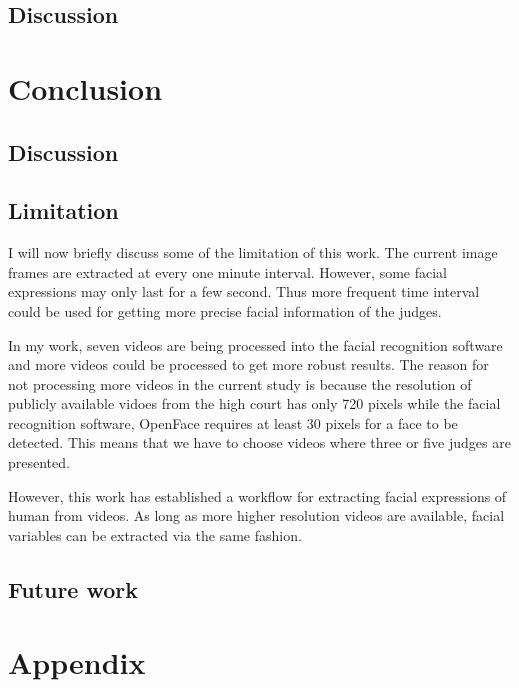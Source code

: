 \documentclass{monashthesis}
\begin{document}
\hypertarget{discussion}{%
\section{Discussion}\label{discussion}}

\hypertarget{conclusion}{%
\chapter{Conclusion}\label{conclusion}}

\hypertarget{discussion-1}{%
\section{Discussion}\label{discussion-1}}

\hypertarget{limitation}{%
\section{Limitation}\label{limitation}}

I will now briefly discuss some of the limitation of this work. The current image frames are extracted at every one minute interval. However, some facial expressions may only last for a few second. Thus more frequent time interval could be used for getting more precise facial information of the judges.

In my work, seven videos are being processed into the facial recognition software and more videos could be processed to get more robust results. The reason for not processing more videos in the current study is because the resolution of publicly available vidoes from the high court has only 720 pixels while the facial recognition software, OpenFace requires at least 30 pixels for a face to be detected. This means that we have to choose videos where three or five judges are presented.

However, this work has established a workflow for extracting facial expressions of human from videos. As long as more higher resolution videos are available, facial variables can be extracted via the same fashion.

\hypertarget{future-work}{%
\section{Future work}\label{future-work}}

\appendix

\hypertarget{appendix}{%
\chapter{Appendix}\label{appendix}}
\end{document}

